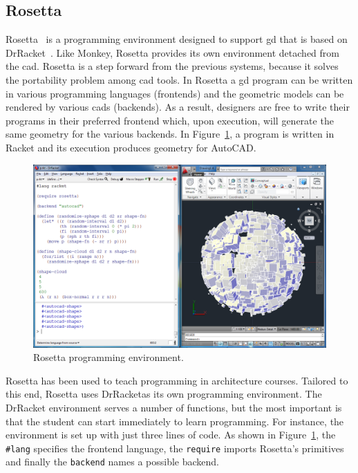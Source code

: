\subsection{Rosetta}
\label{subsec:rosetta}
Rosetta~\cite{lopes2011portable} is a programming environment designed to support \gls{gd} that is based on DrRacket~\cite{findler2002drscheme}. Like Monkey, Rosetta provides its own environment detached from the \gls{cad}. Rosetta is a step forward from the previous systems, because it solves the portability problem among \gls{cad} tools. In Rosetta a \gls{gd} program can be written in various programming languages (frontends) and the geometric models can be rendered by various \glspl{cad} (backends). As a result, designers are free to write their programs in their preferred frontend which, upon execution, will generate the same geometry for the various backends. In Figure~\ref{fig:rosetta}, a program is written in Racket and its execution produces geometry for AutoCAD.

\begin{figure}[!htbp]
  \centering
  \includegraphics[width=1.0\textwidth]{images/rosetta1}
    \caption{Rosetta programming environment.}  
  \label{fig:rosetta}
\end{figure} 

Rosetta has been used to teach programming in architecture courses. Tailored to this end, Rosetta uses DrRacketas its own programming environment. The DrRacket environment serves a number of functions, but the most important is that the student can start immediately to learn programming. For instance, the environment is set up with just three lines of code. As shown in Figure~\ref{fig:rosetta}, the \texttt{\#lang} specifies the frontend language, the \texttt{require} imports Rosetta's primitives and finally the \texttt{backend} names a possible backend.

